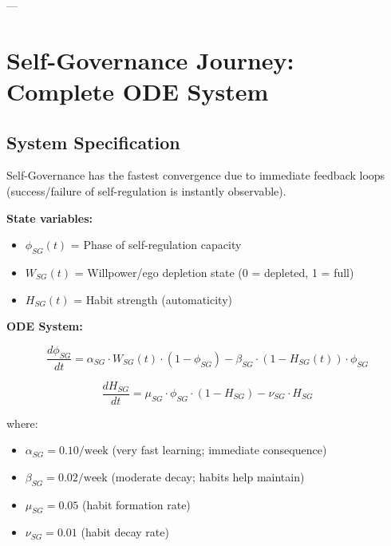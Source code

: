 ---


\section{Self-Governance Journey: Complete ODE System}
\label{ooo:selfgov}

\subsection{System Specification}

Self-Governance has the fastest convergence due to immediate feedback loops
(success/failure of self-regulation is instantly observable).

\textbf{State variables:}
\begin{itemize}[nosep]
\item $\phi_{SG}(t)$ = Phase of self-regulation capacity
\item $W_{SG}(t)$ = Willpower/ego depletion state (0 = depleted, 1 = full)
\item $H_{SG}(t)$ = Habit strength (automaticity)
\end{itemize}

\textbf{ODE System:}

\begin{equation}
\frac{d\phi_{SG}}{dt} = \alpha_{SG} \cdot W_{SG}(t) \cdot (1 - \phi_{SG}) - \beta_{SG} \cdot (1 - H_{SG}(t)) \cdot \phi_{SG}
\label{eq:sg-phase}
\end{equation}

\begin{equation}
\frac{dH_{SG}}{dt} = \mu_{SG} \cdot \phi_{SG} \cdot (1 - H_{SG}) - \nu_{SG} \cdot H_{SG}
\label{eq:sg-habit}
\end{equation}

where:
\begin{itemize}[nosep]
\item $\alpha_{SG} = 0.10 / \text{week}$ (very fast learning; immediate consequence)
\item $\beta_{SG} = 0.02 / \text{week}$ (moderate decay; habits help maintain)
\item $\mu_{SG} = 0.05$ (habit formation rate)
\item $\nu_{SG} = 0.01$ (habit decay rate)
\end{itemize}

